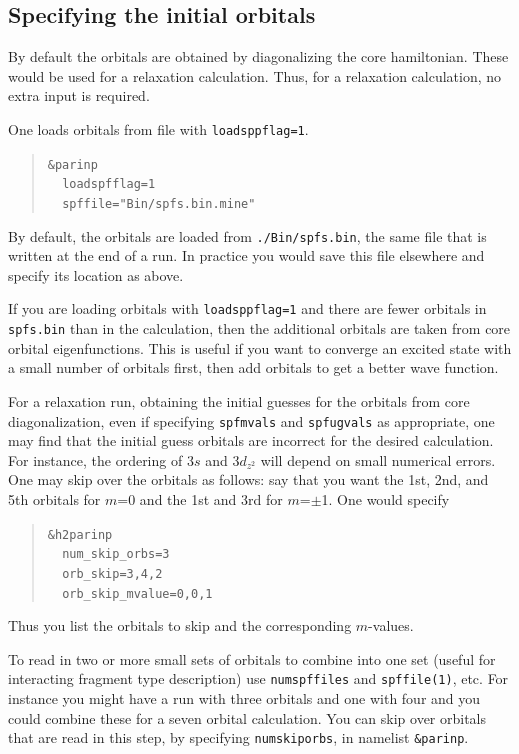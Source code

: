 \documentclass[10pt,leqno, oneside]{book}
\begin{document}
\subsection{Specifying the initial orbitals}



By default the orbitals are obtained by diagonalizing the core hamiltonian.  These would be used for a relaxation calculation.  Thus, for a relaxation calculation, no extra input is required.

One loads orbitals from file with \verb#loadsppflag=1#.   
\begin{quote}
{\footnotesize 
\verb#&parinp# \\
\verb#  loadspfflag=1#\\
\verb#  spffile="Bin/spfs.bin.mine"#}
\end{quote}

By default, the orbitals are loaded from \verb#./Bin/spfs.bin#, the same file that is written at the end of a run.  In practice you would save this file elsewhere and specify its location as above.

If you are loading orbitals with \verb#loadsppflag=1# and there are fewer orbitals in \verb#spfs.bin# than in the calculation, then the additional orbitals are taken from core orbital eigenfunctions.  This is useful if you want to converge an excited state with a small number of orbitals first, then add orbitals to get a better wave function.

For a relaxation run, obtaining the initial guesses for the orbitals from core diagonalization, even if specifying \verb#spfmvals# and \verb#spfugvals# as appropriate, one may find that the initial guess orbitals are incorrect for the desired calculation.  For instance, the ordering of 3$s$ and 3$d_{z^2}$ will depend on small numerical errors.  One may skip over the orbitals as follows: say that you want the 1st, 2nd, and 5th orbitals for $m$=0 and the 1st and 3rd for $m$=$\pm$1.  One would specify
\begin{quote}
{\footnotesize 
\verb#&h2parinp# \\
\verb#  num_skip_orbs=3# \\
\verb#  orb_skip=3,4,2#\\
\verb#  orb_skip_mvalue=0,0,1#}
\end{quote}
Thus you list the orbitals to skip and the corresponding $m$-values.

To read in two or more small sets of orbitals to combine into one set (useful for
interacting fragment type description) use \verb#numspffiles# and \verb#spffile(1)#, etc.  For instance you might have a run with three orbitals and one with
four and you could combine these for a seven orbital calculation.  You can skip over orbitals that are read in this step, by specifying \verb#numskiporbs#,
in namelist \verb#&parinp#.
\end{document}
